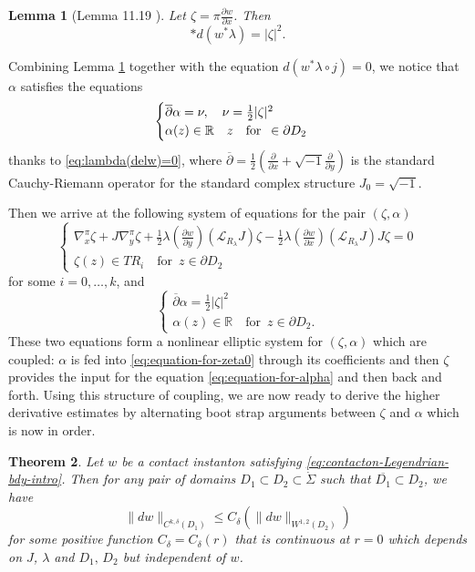 \documentclass[reqno]{amsart}
\def\R{\ifmmode{\mathbb R}\else{$\mathbb R$}\fi} %
\newcommand{\del}{\partial}
\newcommand{\be}{\begin{equation}}
\newcommand{\ee}{\end{equation}}
\theoremstyle{theorem}
\newtheorem{thm}{Theorem}[section]
\newtheorem{lem}[thm]{Lemma}
\theoremstyle{definition}
\numberwithin{equation}{section}
\def\R{{\mathbb R}}
\def\R{{\mathbb R}}
\def\delbar{{\overline \partial}}
\def\R{\ifmmode{\mathbb R}\else{$\mathbb R$}\fi} %
\def\R{{\mathbb R}}
\def\R{{\mathbb R}}
\def\delbar{{\overline \partial}}
\def\CL{{\mathcal L}}
\begin{document}
\begin{lem}[Lemma 11.19 \cite{oh-wang:CR-map2}]\label{lem:*dw*lambda}
 Let $\zeta = \pi \frac{\del w}{\del x}$. Then
$$
*d(w^*\lambda) =|\zeta|^2.
$$
\end{lem}
Combining Lemma \ref{lem:*dw*lambda} together with the equation $d(w^*\lambda\circ j)=0$, we
notice that $\alpha$ satisfies the equations
\be\label{eq:atatau-equation}
\begin{cases}
\delbar \alpha =\nu, \quad \nu =\frac{1}{2}|\zeta|^2 \\
\alpha(z) \in \R \quad z  \quad \text{\rm for } \, \in \del D_2
\end{cases}
\ee
thanks to \eqref{eq:lambda(delw)=0},
where $\delbar=\frac{1}{2}\left(\frac{\del}{\del x}+\sqrt{-1}\frac{\del}{\del y}\right)$
is the standard Cauchy-Riemann operator for the standard complex structure $J_0=\sqrt{-1}$.

Then we arrive at the following system of equations for the pair $(\zeta,\alpha)$
\be\label{eq:equation-for-zeta0}
\begin{cases}\nabla_x^\pi \zeta + J \nabla_y^\pi \zeta
+ \frac{1}{2} \lambda(\frac{\del w}{\del y})(\CL_{R_\lambda}J)\zeta - \frac{1}{2} \lambda(\frac{\del w}{\del x})(\CL_{R_\lambda}J)J\zeta =0\\
\zeta(z) \in TR_i \quad \text{for } \, z \in \del D_2
\end{cases}
\ee
for some $i = 0, \ldots, k$, and
\be\label{eq:equation-for-alpha}
\begin{cases}
\delbar \alpha = \frac{1}{2}|\zeta|^2 \\
\alpha(z) \in \R \quad \text{for } \, z \in \del D_2.
\end{cases}
\ee
These two equations form a nonlinear elliptic system for $(\zeta,\alpha)$ which are coupled:
$\alpha$ is fed into
\eqref{eq:equation-for-zeta0} through its coefficients and then $\zeta$ provides the input
for the equation \eqref{eq:equation-for-alpha} and then back and forth. Using this structure of
coupling, we are now ready to derive the higher derivative estimates
by alternating boot strap arguments between $\zeta$ and $\alpha$
which is now in order.

\begin{thm}\label{thm:local-regularity}
Let $w$ be a contact instanton satisfying \eqref{eq:contacton-Legendrian-bdy-intro}.
Then for any pair of domains $D_1 \subset D_2 \subset \dot \Sigma$ such that $\overline{D_1}\subset D_2$, we have
$$
\|dw\|_{C^{k,\delta}(D_1)} \leq C_\delta( \|dw\|_{W^{1,2}(D_2)})
$$
for some  positive function $C_\delta = C_\delta(r)$ that
is continuous at $r = 0$ which depends on $J$, $\lambda$ and $D_1, \, D_2$
but independent of $w$.
\end{thm}
\end{document}
